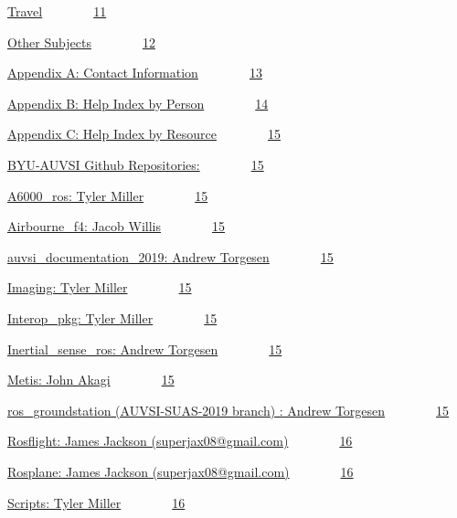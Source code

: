 {\protect\hyperlink{h.7r3s7uwv05q3}{Travel}}{~~~~~~~~}{\protect\hyperlink{h.7r3s7uwv05q3}{11}}

{\protect\hyperlink{h.b3bhon3qhxn5}{Other
Subjects}}{~~~~~~~~}{\protect\hyperlink{h.b3bhon3qhxn5}{12}}

{\protect\hyperlink{h.y4whnbg7qmd5}{Appendix A: Contact
Information}}{~~~~~~~~}{\protect\hyperlink{h.y4whnbg7qmd5}{13}}

{\protect\hyperlink{h.rx44x066pd94}{Appendix B: Help Index by
Person}}{~~~~~~~~}{\protect\hyperlink{h.rx44x066pd94}{14}}

{\protect\hyperlink{h.45veev2p372u}{Appendix C: Help Index by
Resource}}{~~~~~~~~}{\protect\hyperlink{h.45veev2p372u}{15}}

{\protect\hyperlink{h.fzoo3toav61z}{BYU-AUVSI Github
Repositories:}}{~~~~~~~~}{\protect\hyperlink{h.fzoo3toav61z}{15}}

{\protect\hyperlink{h.ez5i7wokvzkz}{A6000\_ros: Tyler
Miller}}{~~~~~~~~}{\protect\hyperlink{h.ez5i7wokvzkz}{15}}

{\protect\hyperlink{h.40v6z6uc89r7}{Airbourne\_f4: Jacob
Willis}}{~~~~~~~~}{\protect\hyperlink{h.40v6z6uc89r7}{15}}

{\protect\hyperlink{h.smcq1h7rkxh}{auvsi\_documentation\_2019: Andrew
Torgesen}}{~~~~~~~~}{\protect\hyperlink{h.smcq1h7rkxh}{15}}

{\protect\hyperlink{h.mabru5lpfx9n}{Imaging: Tyler
Miller}}{~~~~~~~~}{\protect\hyperlink{h.mabru5lpfx9n}{15}}

{\protect\hyperlink{h.n49nu7bx5vod}{Interop\_pkg: Tyler
Miller}}{~~~~~~~~}{\protect\hyperlink{h.n49nu7bx5vod}{15}}

{\protect\hyperlink{h.3xc7veylyan1}{Inertial\_sense\_ros: Andrew
Torgesen}}{~~~~~~~~}{\protect\hyperlink{h.3xc7veylyan1}{15}}

{\protect\hyperlink{h.md8utgthwf1}{Metis: John
Akagi}}{~~~~~~~~}{\protect\hyperlink{h.md8utgthwf1}{15}}

{\protect\hyperlink{h.oze4xaqxxlu9}{ros\_groundstation (AUVSI-SUAS-2019
branch) : Andrew
Torgesen}}{~~~~~~~~}{\protect\hyperlink{h.oze4xaqxxlu9}{15}}

{\protect\hyperlink{h.phcluy8fl6f3}{Rosflight: James Jackson
(superjax08@gmail.com)}}{~~~~~~~~}{\protect\hyperlink{h.phcluy8fl6f3}{16}}

{\protect\hyperlink{h.rfp5kydue3f1}{Rosplane: James Jackson
(superjax08@gmail.com)}}{~~~~~~~~}{\protect\hyperlink{h.rfp5kydue3f1}{16}}

{\protect\hyperlink{h.hbcl1x4i3t9h}{Scripts: Tyler
Miller}}{~~~~~~~~}{\protect\hyperlink{h.hbcl1x4i3t9h}{16}}

